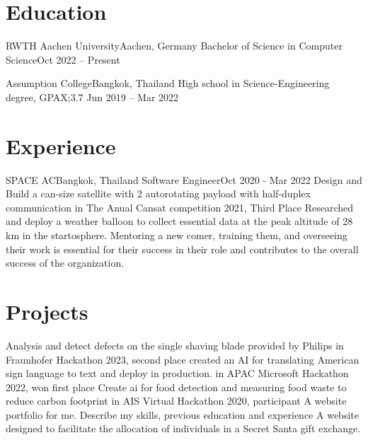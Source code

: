\section{Education}
\resumeSubHeadingListStart
\resumeSubheading
{RWTH Aachen University}{Aachen, Germany}
{Bachelor of Science in Computer Science}{Oct 2022 -- Present}

\resumeSubheading
{Assumption College}{Bangkok, Thailand}
{High school in Science-Engineering degree, GPAX;3.7 }{ Jun 2019 -- Mar 2022}
\resumeSubHeadingListEnd


\section{Experience}
\resumeSubHeadingListStart

\resumeSubheading
{SPACE AC}{Bangkok, Thailand}
{Software Engineer}{Oct 2020 - Mar 2022}
\resumeItemListStart
{}
{Design and Build a can-size satellite with 2 autorotating payload with half-duplex communication in The Anual Cansat competition 2021, Third Place}
{Researched and deploy a weather balloon to collect essential data at the peak altitude of 28 km in the startosphere. }
{Mentoring a new comer, training them, and overseeing their work is essential for their success in their role and contributes to the overall success of the organization.}
\resumeItemListEnd



\resumeSubHeadingListEnd


\section{Projects}
\resumeSubHeadingListStart
{}
{Analysis and detect defects on the single shaving blade provided by Philips in Fraunhofer Hackathon 2023, second place}
{created an AI for translating American sign language to text and deploy in production. in APAC Microsoft Hackathon 2022, won first place}
{Create ai for food detection and measuring food waste to reduce carbon footprint in AIS Virtual Hackathon 2020, participant}
{A website portfolio for me. Describe my skills, previous education and experience}
{A website designed to facilitate the allocation of individuals in a Secret Santa gift exchange.}
\resumeSubHeadingListEnd

